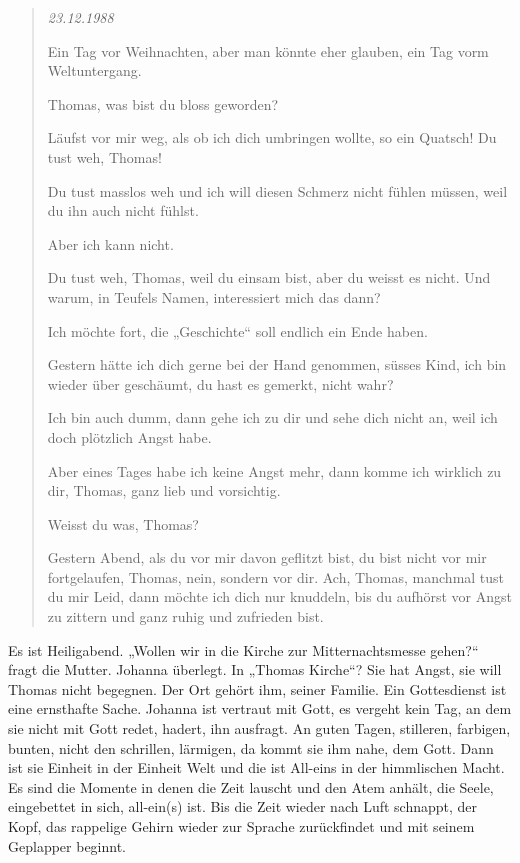 \documentclass[10pt,a5paper]{book}
\newenvironment{tg}{\begin{quote}\em}{\end{quote}}
\begin{document}
\begin{tg}
23.12.1988

Ein Tag vor Weihnachten, aber man könnte eher glauben, ein Tag vorm Weltuntergang.

Thomas, was bist du bloss geworden?

Läufst vor mir weg, als ob ich dich umbringen wollte, so ein Quatsch!
Du tust weh, Thomas!

Du tust masslos weh und ich will diesen Schmerz nicht fühlen müssen, weil du ihn auch nicht fühlst.

Aber ich kann nicht.

Du tust weh, Thomas, weil du einsam bist, aber du weisst es nicht. Und warum, in Teufels Namen, interessiert mich das dann?

Ich möchte fort, die „Geschichte“ soll endlich ein Ende haben.

Gestern hätte ich dich gerne bei der Hand genommen, süsses Kind, ich bin wieder über geschäumt, du hast es gemerkt, nicht wahr?

Ich bin auch dumm, dann gehe ich zu dir und sehe dich nicht an, weil ich doch plötzlich Angst habe.

Aber eines Tages habe ich keine Angst mehr, dann komme ich wirklich zu dir, Thomas, ganz lieb und vorsichtig.

Weisst du was, Thomas?

Gestern Abend, als du vor mir davon geflitzt bist, du bist nicht vor mir fortgelaufen, Thomas, nein, sondern vor dir. Ach, Thomas, manchmal tust du mir Leid, dann möchte ich dich nur knuddeln, bis du aufhörst vor Angst zu zittern und ganz ruhig und zufrieden bist.
\end{tg}


Es ist Heiligabend. „Wollen wir in die Kirche zur Mitternachtsmesse gehen?“ fragt die Mutter. Johanna überlegt. In „Thomas Kirche“? Sie hat Angst, sie will Thomas nicht begegnen. Der Ort gehört ihm, seiner Familie. 
Ein Gottesdienst ist eine ernsthafte Sache. Johanna ist vertraut mit Gott, es vergeht kein Tag, an dem sie nicht mit Gott redet, hadert, ihn ausfragt. An guten Tagen, stilleren, farbigen, bunten, nicht den schrillen, lärmigen, da kommt sie ihm nahe, dem Gott. Dann ist sie Einheit in der Einheit Welt und die ist All-eins in der himmlischen Macht. Es sind die Momente in denen die Zeit lauscht und den Atem anhält, die Seele, eingebettet in sich, all-ein(s) ist. Bis die Zeit wieder nach Luft schnappt, der Kopf, das rappelige Gehirn wieder zur Sprache zurückfindet und mit seinem Geplapper beginnt.
\end{document}
